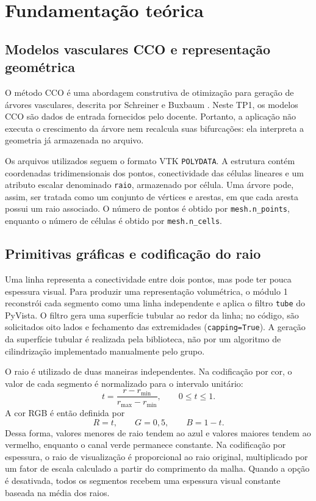 \section{Fundamentação teórica}

\subsection{Modelos vasculares CCO e representação geométrica}

O método CCO é uma abordagem construtiva de otimização para geração de árvores vasculares, descrita por Schreiner e Buxbaum \cite{schreiner1993}. Neste TP1, os modelos CCO são dados de entrada fornecidos pelo docente. Portanto, a aplicação não executa o crescimento da árvore nem recalcula suas bifurcações: ela interpreta a geometria já armazenada no arquivo.

Os arquivos utilizados seguem o formato VTK \texttt{POLYDATA}. A estrutura contém coordenadas tridimensionais dos pontos, conectividade das células lineares e um atributo escalar denominado \texttt{raio}, armazenado por célula. Uma árvore pode, assim, ser tratada como um conjunto de vértices e arestas, em que cada aresta possui um raio associado. O número de pontos é obtido por \texttt{mesh.n\_points}, enquanto o número de células é obtido por \texttt{mesh.n\_cells}.

\subsection{Primitivas gráficas e codificação do raio}

Uma linha representa a conectividade entre dois pontos, mas pode ter pouca espessura visual. Para produzir uma representação volumétrica, o módulo 1 reconstrói cada segmento como uma linha independente e aplica o filtro \texttt{tube} do PyVista. O filtro gera uma superfície tubular ao redor da linha; no código, são solicitados oito lados e fechamento das extremidades (\texttt{capping=True}). A geração da superfície tubular é realizada pela biblioteca, não por um algoritmo de cilindrização implementado manualmente pelo grupo.

O raio é utilizado de duas maneiras independentes. Na codificação por cor, o valor de cada segmento é normalizado para o intervalo unitário:
\[
t=\frac{r-r_{\min}}{r_{\max}-r_{\min}}, \qquad 0\leq t\leq 1.
\]
A cor RGB é então definida por
\[
R=t,\qquad G=0{,}5,\qquad B=1-t.
\]
Dessa forma, valores menores de raio tendem ao azul e valores maiores tendem ao vermelho, enquanto o canal verde permanece constante. Na codificação por espessura, o raio de visualização é proporcional ao raio original, multiplicado por um fator de escala calculado a partir do comprimento da malha. Quando a opção é desativada, todos os segmentos recebem uma espessura visual constante baseada na média dos raios.

